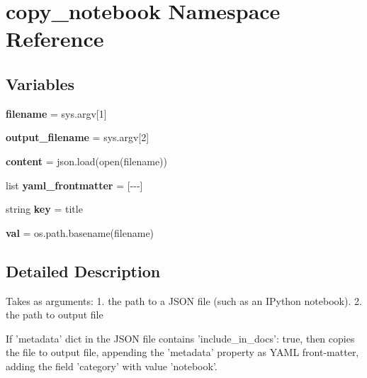 \hypertarget{namespacecopy__notebook}{}\section{copy\+\_\+notebook Namespace Reference}
\label{namespacecopy__notebook}
\subsection*{Variables}
\begin{DoxyCompactItemize}
\item 
\mbox{\label{namespacecopy__notebook_aecdf1179125f225ad7678368c02d98bf}} 
{\bfseries filename} = sys.\+argv\mbox{[}1\mbox{]}
\item 
\mbox{\label{namespacecopy__notebook_a7c11205b390d1d65d69aec904cbb0581}} 
{\bfseries output\+\_\+filename} = sys.\+argv\mbox{[}2\mbox{]}
\item 
\mbox{\label{namespacecopy__notebook_adeec43d805206b9c6964e575f45d0f82}} 
{\bfseries content} = json.\+load(open(filename))
\item 
\mbox{\label{namespacecopy__notebook_a4c01519e389736c49fc23a3d72e7585a}} 
list {\bfseries yaml\+\_\+frontmatter} = \mbox{[}\textquotesingle{}-\/-\/-\/\textquotesingle{}\mbox{]}
\item 
\mbox{\label{namespacecopy__notebook_a76937c5a8aefdc396e0afbb5fbd7c5e7}} 
string {\bfseries key} = \textquotesingle{}title\textquotesingle{}
\item 
\mbox{\label{namespacecopy__notebook_ab3ff76041f10cb5346cb9757b50f4964}} 
{\bfseries val} = os.\+path.\+basename(filename)
\end{DoxyCompactItemize}


\subsection{Detailed Description}
\begin{DoxyVerb}Takes as arguments:
1. the path to a JSON file (such as an IPython notebook).
2. the path to output file

If 'metadata' dict in the JSON file contains 'include_in_docs': true,
then copies the file to output file, appending the 'metadata' property
as YAML front-matter, adding the field 'category' with value 'notebook'.
\end{DoxyVerb}
 